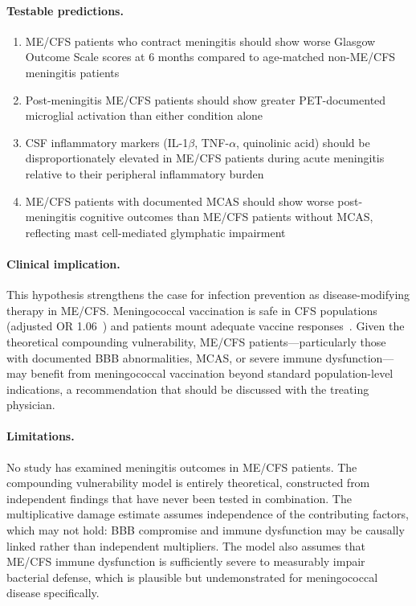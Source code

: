 \begin{speculation}
\paragraph{Testable predictions.}
\begin{enumerate}
    \item ME/CFS patients who contract meningitis should show worse Glasgow Outcome Scale scores at 6 months compared to age-matched non-ME/CFS meningitis patients
    \item Post-meningitis ME/CFS patients should show greater PET-documented microglial activation than either condition alone
    \item CSF inflammatory markers (IL-1$\beta$, TNF-$\alpha$, quinolinic acid) should be disproportionately elevated in ME/CFS patients during acute meningitis relative to their peripheral inflammatory burden
    \item ME/CFS patients with documented MCAS should show worse post-meningitis cognitive outcomes than ME/CFS patients without MCAS, reflecting mast cell-mediated glymphatic impairment
\end{enumerate}

\paragraph{Clinical implication.}
This hypothesis strengthens the case for infection prevention as disease-modifying therapy in ME/CFS. Meningococcal vaccination is safe in CFS populations (adjusted OR 1.06~\cite{Magnus2009meningococcal}) and patients mount adequate vaccine responses~\cite{Prinsen2012vaccine}. Given the theoretical compounding vulnerability, ME/CFS patients---particularly those with documented BBB abnormalities, MCAS, or severe immune dysfunction---may benefit from meningococcal vaccination beyond standard population-level indications, a recommendation that should be discussed with the treating physician.

\paragraph{Limitations.}
No study has examined meningitis outcomes in ME/CFS patients. The compounding vulnerability model is entirely theoretical, constructed from independent findings that have never been tested in combination. The multiplicative damage estimate assumes independence of the contributing factors, which may not hold: BBB compromise and immune dysfunction may be causally linked rather than independent multipliers. The model also assumes that ME/CFS immune dysfunction is sufficiently severe to measurably impair bacterial defense, which is plausible but undemonstrated for meningococcal disease specifically.
\end{speculation}


